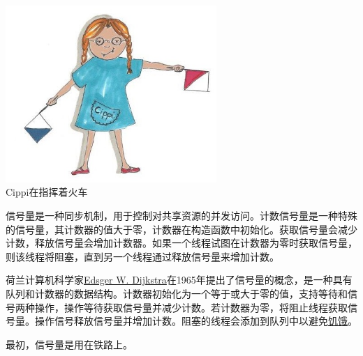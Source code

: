\begin{center}
\includegraphics[width=0.6\textwidth]{content/3/chapter6/images/15.png}\\
Cippi在指挥着火车
\end{center}

信号量是一种同步机制，用于控制对共享资源的并发访问。计数信号量是一种特殊的信号量，其计数器的值大于零，计数器在构造函数中初始化。获取信号量会减少计数，释放信号量会增加计数器。如果一个线程试图在计数器为零时获取信号量，则该线程将阻塞，直到另一个线程通过释放信号量来增加计数。

\begin{tcolorbox}[breakable,enhanced jigsaw,colback=blue!5!white,colframe=blue!75!black,title={Edsger W. Dijkstra发明了信号量}]
	
荷兰计算机科学家\href{https://en.wikipedia.org/wiki/Edsger_W._Dijkstra}{Edsger W. Dijkstra}在1965年提出了信号量的概念，是一种具有队列和计数器的数据结构。计数器初始化为一个等于或大于零的值，支持等待和信号两种操作，操作等待获取信号量并减少计数。若计数器为零，将阻止线程获取信号量。操作信号释放信号量并增加计数。阻塞的线程会添加到队列中以避免\href{https://en.wikipedia.org/wiki/Starvation_(computer_science)}{饥饿}。

最初，信号量是用在铁路上。
	
\end{tcolorbox}

